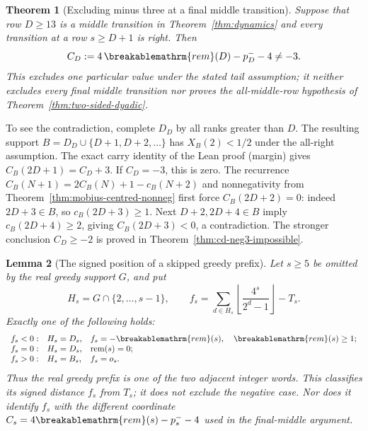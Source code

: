 \documentclass[11pt]{article}
\theoremstyle{plain}
\newtheorem{thm}{Theorem}[section]
\newtheorem{lem}[thm]{Lemma}
\theoremstyle{definition}
\theoremstyle{remark}
\renewcommand{\mathrm}[1]{\ifmmode\breakablemathrm{#1}\else\textrm{#1}\fi}%
\begin{document}
\par
\noindent\begin{minipage}{\linewidth}
\begin{thm}[Excluding minus three at a final middle transition]
\label{thm:final-middle-cell}
Suppose that row $D\ge13$ is a middle transition in
Theorem~\ref{thm:dynamics} and every transition at a row $s\ge D+1$
is right.  Then
\[
 C_D:=4\,\mathrm{rem}(D)-p_D^--4\ne-3.
\]
This excludes one particular value under the stated tail assumption;
it neither excludes every final middle transition nor proves the
all-middle-row hypothesis of Theorem~\ref{thm:two-sided-dyadic}.
\end{thm}
\end{minipage}\par
To see the contradiction, complete $D_D$ by all ranks greater than $D$.
The resulting support $B=D_D\cup\{D+1,D+2,\ldots\}$ has
$X_B(2)<1/2$ under the all-right assumption.  The exact carry identity
of the Lean proof (margin) gives $C_B(2D+1)=C_D+3$.  If $C_D=-3$, this is zero.
The recurrence
$C_B(N+1)=2C_B(N)+1-c_B(N+2)$ and nonnegativity from
Theorem~\ref{thm:mobius-centred-nonneg} first force $C_B(2D+2)=0$:
indeed $2D+3\in B$, so $c_B(2D+3)\ge1$.
Next $D+2,2D+4\in B$ imply $c_B(2D+4)\ge2$, giving
$C_B(2D+3)<0$, a contradiction.  The stronger conclusion
$C_D\ge-2$ is proved in Theorem~\ref{thm:cd-neg3-impossible}.


\begin{lem}[The signed position of a skipped greedy prefix]
\label{lem:skipped-endpoint-trichotomy}
Let $s\ge5$ be omitted by the real greedy support $G$, and put
\[
 H_s=G\cap\{2,\ldots,s-1\},\qquad
 f_s=\sum_{d\in H_s}\left\lfloor\frac{4^s}{2^d-1}\right\rfloor-T_s.
\]
Exactly one of the following holds:
\[
 \begin{array}{lll}
 f_s<0:& H_s=D_s,& f_s=-\mathrm{rem}(s),\quad \mathrm{rem}(s)\ge1;\\
 f_s=0:& H_s=D_s,& \mathrm{rem}(s)=0;\\
 f_s>0:& H_s=B_s,& f_s=o_s.
 \end{array}
\]
Thus the real greedy prefix is one of the two adjacent integer words.
This classifies its signed distance $f_s$ from $T_s$; it does not
exclude the negative case.  Nor does it identify $f_s$ with the
different coordinate $C_s=4\mathrm{rem}(s)-p_s^- -4$ used in the
final-middle argument.
\end{lem}
\end{document}
